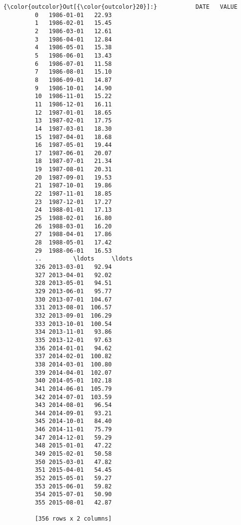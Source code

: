 \documentclass{article}
\begin{document}
            \begin{Verbatim}[commandchars=\\\{\}]
{\color{outcolor}Out[{\color{outcolor}20}]:}           DATE   VALUE
         0   1986-01-01   22.93
         1   1986-02-01   15.45
         2   1986-03-01   12.61
         3   1986-04-01   12.84
         4   1986-05-01   15.38
         5   1986-06-01   13.43
         6   1986-07-01   11.58
         7   1986-08-01   15.10
         8   1986-09-01   14.87
         9   1986-10-01   14.90
         10  1986-11-01   15.22
         11  1986-12-01   16.11
         12  1987-01-01   18.65
         13  1987-02-01   17.75
         14  1987-03-01   18.30
         15  1987-04-01   18.68
         16  1987-05-01   19.44
         17  1987-06-01   20.07
         18  1987-07-01   21.34
         19  1987-08-01   20.31
         20  1987-09-01   19.53
         21  1987-10-01   19.86
         22  1987-11-01   18.85
         23  1987-12-01   17.27
         24  1988-01-01   17.13
         25  1988-02-01   16.80
         26  1988-03-01   16.20
         27  1988-04-01   17.86
         28  1988-05-01   17.42
         29  1988-06-01   16.53
         ..         \ldots     \ldots
         326 2013-03-01   92.94
         327 2013-04-01   92.02
         328 2013-05-01   94.51
         329 2013-06-01   95.77
         330 2013-07-01  104.67
         331 2013-08-01  106.57
         332 2013-09-01  106.29
         333 2013-10-01  100.54
         334 2013-11-01   93.86
         335 2013-12-01   97.63
         336 2014-01-01   94.62
         337 2014-02-01  100.82
         338 2014-03-01  100.80
         339 2014-04-01  102.07
         340 2014-05-01  102.18
         341 2014-06-01  105.79
         342 2014-07-01  103.59
         343 2014-08-01   96.54
         344 2014-09-01   93.21
         345 2014-10-01   84.40
         346 2014-11-01   75.79
         347 2014-12-01   59.29
         348 2015-01-01   47.22
         349 2015-02-01   50.58
         350 2015-03-01   47.82
         351 2015-04-01   54.45
         352 2015-05-01   59.27
         353 2015-06-01   59.82
         354 2015-07-01   50.90
         355 2015-08-01   42.87
         
         [356 rows x 2 columns]
\end{Verbatim}
        
\end{document}
